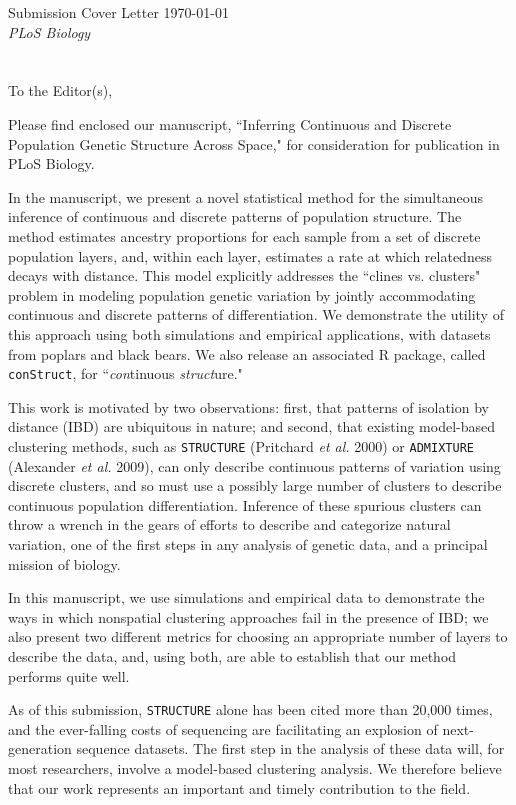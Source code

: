 \documentclass[11pt]{letter}
\begin{document}

Submission Cover Letter \hfill	\today\\
\emph{PLoS Biology}
\\\\\\
To the Editor(s),

Please find enclosed our manuscript,  
``Inferring Continuous and Discrete Population Genetic Structure Across Space,"
for consideration for publication in PLoS Biology.

In the manuscript, we present a novel statistical method 
for the simultaneous inference of continuous and discrete patterns of population structure.
The method estimates ancestry proportions for each 
sample from a set of discrete population layers, 
and, within each layer, estimates a rate at which relatedness decays with distance.
This model explicitly addresses the ``clines vs. clusters" problem in 
modeling population genetic variation by jointly accommodating 
continuous and discrete patterns of differentiation. 
We demonstrate the utility of this approach using both simulations 
and empirical applications, with datasets from poplars and black bears. 
We also release an associated R package, called \texttt{conStruct}, 
for ``\emph{con}tinuous \emph{struct}ure."

This work is motivated by two observations:
first, that patterns of isolation by distance (IBD) are ubiquitous in nature; 
and second, that existing model-based clustering methods, 
such as \texttt{STRUCTURE} (Pritchard \emph{et al.} 2000) 
or \texttt{ADMIXTURE} (Alexander \emph{et al.} 2009), 
can only describe continuous patterns of variation using discrete clusters, 
and so must use a possibly large number of clusters
to describe continuous population differentiation.
Inference of these spurious clusters can throw a 
wrench in the gears of efforts to describe and categorize natural variation, 
one of the first steps in any analysis of genetic data, 
and a principal mission of biology.  

In this manuscript,
we use simulations and empirical data to demonstrate 
the ways in which nonspatial clustering approaches 
fail in the presence of IBD; 
we also present two different metrics for choosing an appropriate 
number of layers to describe the data, 
and, using both, 
are able to establish that our method performs quite well.

As of this submission, \texttt{STRUCTURE} alone has been cited more than 20,000 times, 
and the ever-falling costs of sequencing are facilitating an explosion of next-generation sequence datasets.  
The first step in the analysis of these data will, for most researchers, 
involve a model-based clustering analysis.
We therefore believe that our work represents an important and timely contribution to the field.  
\end{document}
